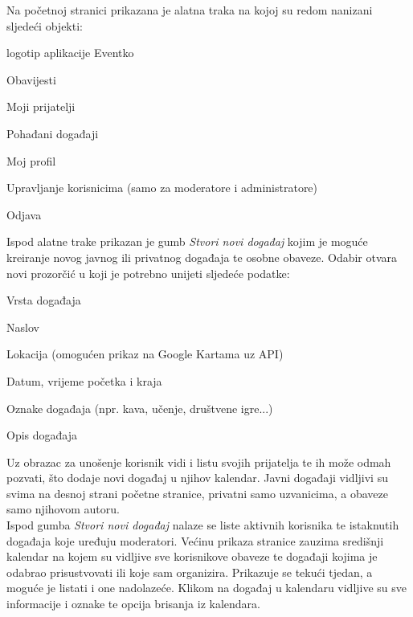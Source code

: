 		\indent Na početnoj stranici prikazana je alatna traka na kojoj su redom nanizani sljedeći objekti:
		
		\begin{packed_item}
			\item logotip aplikacije Eventko
			\item Obavijesti
			\item Moji prijatelji
			\item Pohađani događaji
			\item Moj profil
			\item Upravljanje korisnicima (samo za moderatore i administratore)
			\item Odjava
		\end{packed_item}
	
		\indent Ispod alatne trake prikazan je gumb \textit{Stvori novi događaj} kojim je moguće kreiranje novog javnog ili privatnog događaja te osobne obaveze. Odabir otvara novi prozorčić u koji je potrebno unijeti sljedeće podatke:
		
		\begin{packed_item}
			\item Vrsta događaja
			\item Naslov
			\item Lokacija (omogućen prikaz na Google Kartama uz API)
			\item Datum, vrijeme početka i kraja
			\item Oznake događaja (npr. kava, učenje, društvene igre...)
			\item Opis događaja
		\end{packed_item}
	
		\indent Uz obrazac za unošenje korisnik vidi i listu svojih prijatelja te ih može odmah pozvati, što dodaje novi događaj u njihov kalendar. Javni događaji vidljivi su svima na desnoj strani početne stranice, privatni samo uzvanicima, a obaveze samo njihovom autoru. \\
	
		\indent Ispod gumba \textit{Stvori novi događaj} nalaze se liste aktivnih korisnika te istaknutih događaja koje uređuju moderatori. Većinu prikaza stranice zauzima središnji kalendar na kojem su vidljive sve korisnikove obaveze te događaji kojima je odabrao prisustvovati ili koje sam organizira. Prikazuje se tekući tjedan, a moguće je listati i one nadolazeće. Klikom na događaj u kalendaru vidljive su sve informacije i oznake te opcija brisanja iz kalendara. \\
		
